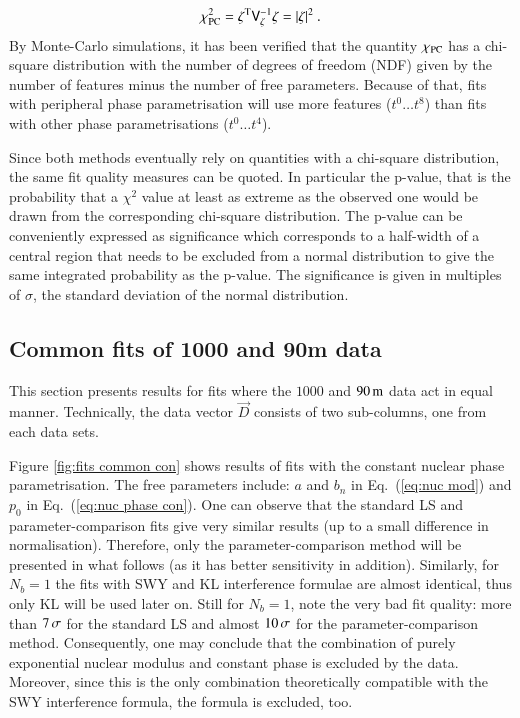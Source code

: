 \begin{equation}
\label{eq:chi sq parcmp}
	\chi_{\rm PC}^2 = \zeta^{\rm T} \mathsf{V}_{\zeta}^{-1} \zeta = |\zeta|^2 \ .
\end{equation}
By Monte-Carlo simulations, it has been verified that the quantity $\chi_{\rm PC}$ has a chi-square distribution with the number of degrees of freedom (NDF) given by the number of features minus the number of free parameters. Because of that, fits with peripheral phase parametrisation will use more features ($t^0 \ldots t^8$) than fits with other phase parametrisations ($t^0 \ldots t^4$).


Since both methods eventually rely on quantities with a chi-square distribution, the same fit quality measures can be quoted. In particular the p-value, that is the probability that a $\chi^2$ value at least as extreme as the observed one would be drawn from the corresponding chi-square distribution. The p-value can be conveniently expressed as significance which corresponds to a half-width of a central region that needs to be excluded from a normal distribution to give the same integrated probability as the p-value. The significance is given in multiples of $\sigma$, the standard deviation of the normal distribution.



\subsection{Common fits of 1000 and 90m data}
\label{sec:cni common fits}

This section presents results for fits where the $1000$ and $90\,{\rm m}$ data act in equal manner. Technically, the data vector $\vec D$ consists of two sub-columns, one from each data sets.

Figure \ref{fig:fits common con} shows results of fits with the constant nuclear phase parametrisation. The free parameters include: $a$ and $b_n$ in Eq.~(\ref{eq:nuc mod}) and $p_0$ in Eq.~(\ref{eq:nuc phase con}). One can observe that the standard LS and parameter-comparison fits give very similar results (up to a small difference in normalisation). Therefore, only the parameter-comparison method will be presented in what follows (as it has better sensitivity in addition). Similarly, for $N_b = 1$ the fits with SWY and KL interference formulae are almost identical, thus only KL will be used later on. Still for $N_b = 1$, note the very bad fit quality: more than $7\,{\rm \sigma}$ for the standard LS and almost $10\,{\rm \sigma}$ for the parameter-comparison method. Consequently, one may conclude that the combination of purely exponential nuclear modulus and constant phase is excluded by the data. Moreover, since this is the only combination theoretically compatible with the SWY interference formula, the formula is excluded, too.

